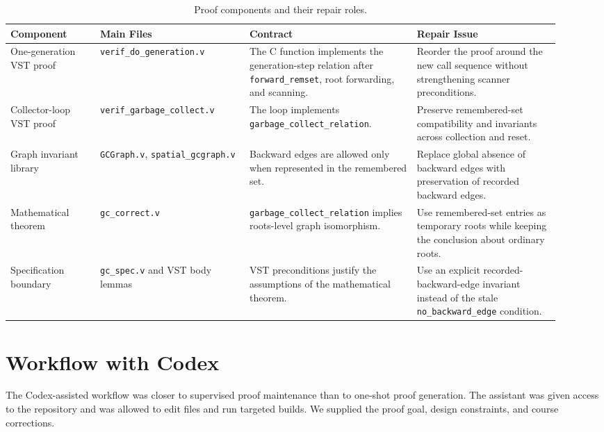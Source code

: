 \documentclass[acmsmall,nonacm]{acmart}
\newcommand{\VST}{VST}
\newcommand{\tus}{\_\allowbreak{}}
\begin{document}
\begin{table}[htbp]
\centering
\caption{Proof components and their repair roles.}
\label{tab:proof-architecture}
\scriptsize
\begin{tabular}{@{}L{0.15\linewidth}L{0.25\linewidth}L{0.28\linewidth}L{0.24\linewidth}@{}}
\toprule
Component & Main Files & Contract & Repair Issue \\
\midrule
One-generation \VST{} proof &
\texttt{verif\tus do\tus generation.v} &
The C function implements the generation-step relation after
\texttt{forward\tus remset}, root forwarding, and scanning. &
Reorder the proof around the new call sequence without strengthening scanner
preconditions. \\
Collector-loop \VST{} proof &
\texttt{verif\tus garbage\tus collect.v} &
The loop implements \texttt{garbage\tus collect\tus relation}. &
Preserve remembered-set compatibility and invariants across collection and
reset. \\
Graph invariant library &
\texttt{GCGraph.v}, \texttt{spatial\tus gcgraph.v} &
Backward edges are allowed only when represented in the remembered set. &
Replace global absence of backward edges with preservation of recorded backward
edges. \\
Mathematical theorem &
\texttt{gc\tus correct.v} &
\texttt{garbage\tus collect\tus relation} implies roots-level graph isomorphism. &
Use remembered-set entries as temporary roots while keeping the conclusion about
ordinary roots. \\
Specification boundary &
\texttt{gc\tus spec.v} and \VST{} body lemmas &
\VST{} preconditions justify the assumptions of the mathematical theorem. &
Use an explicit recorded-backward-edge invariant instead of the stale
\texttt{no\tus backward\tus edge} condition. \\
\bottomrule
\end{tabular}
\end{table}

\section{Workflow with Codex}

The Codex-assisted workflow was closer to supervised proof maintenance than to
one-shot proof generation.  The assistant was given access to the repository and
was allowed to edit files and run targeted builds.  We supplied the proof
goal, design constraints, and course corrections.
\end{document}

